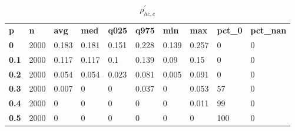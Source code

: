 \begin{table}[h]
 \centering 
\footnotesize
\caption{$\rho_{hc,c}^\prime $}
\label{tab:alphahcc}
\begin{tabular}[h]{| l l l l l l l l l l|
    } \hline
\textbf{ p} & \textbf{ n} & \textbf{ avg} & \textbf{ med} & \textbf{ q025} & \textbf{ q975} & \textbf{ min} & \textbf{ max} & \textbf{ pct\_0} & \textbf{ pct\_nan}
           \\
  \textbf{  0} & 2000 & 0.183 & 0.181 & 0.151 & 0.228 & 0.139 & 0.257 &   0 & 0
           \\
  \textbf{0.1} & 2000 & 0.117 & 0.117 &   0.1 & 0.139 &  0.09 &  0.15 &   0 & 0
           \\
  \textbf{0.2} & 2000 & 0.054 & 0.054 & 0.023 & 0.081 & 0.005 & 0.091 &   0 & 0
           \\
  \textbf{0.3} & 2000 & 0.007 &     0 &     0 & 0.037 &     0 & 0.053 &  57 & 0
           \\
  \textbf{0.4} & 2000 &     0 &     0 &     0 &     0 &     0 & 0.011 &  99 & 0
           \\
  \textbf{0.5} & 2000 &     0 &     0 &     0 &     0 &     0 &     0 & 100 & 0
           \\
 \hline \end{tabular}
 \end{table}
